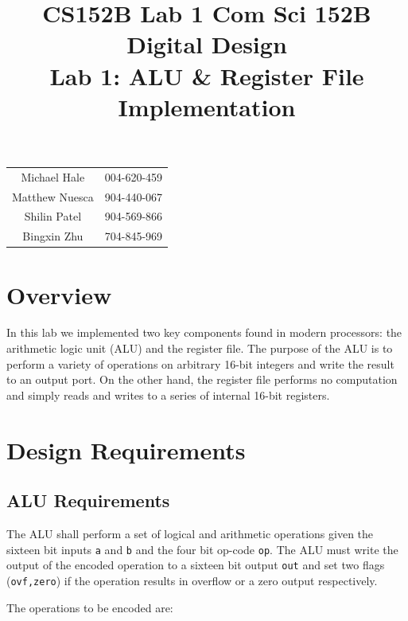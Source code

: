 \documentclass[11pt]{article}
\title{CS152B Lab 1}
\begin{document}
	
\title{\vspace{-0.5in} Com Sci 152B Digital Design \\
	Lab 1: ALU \& Register File Implementation }
\date{}
\maketitle
\vspace{-0.75in}
\begin{center}
\begin{tabular}{cc}
	Michael Hale & 004-620-459 \\ 
	Matthew Nuesca & 904-440-067 \\ 
	Shilin Patel & 904-569-866 \\ 
	Bingxin Zhu & 704-845-969
\end{tabular}
\end{center}

\section{Overview}

In this lab we implemented two key components found in modern processors: the arithmetic logic unit (ALU) and the register file. The purpose of the ALU is to perform a variety of operations on arbitrary 16-bit integers and write the result to an output port. On the other hand, the register file performs no computation and simply reads and writes to a series of internal 16-bit registers. 

\section{Design Requirements}
\subsection{ALU Requirements}
The ALU shall perform a set of logical and arithmetic operations given the sixteen bit inputs \texttt{a} and \texttt{b} and the four bit op-code \texttt{op}. The ALU must write the output of the encoded operation to a sixteen bit output \texttt{out} and set two flags (\texttt{ovf,zero}) if the operation results in overflow or a zero output respectively. 

The operations to be encoded are: \\
\end{document}
